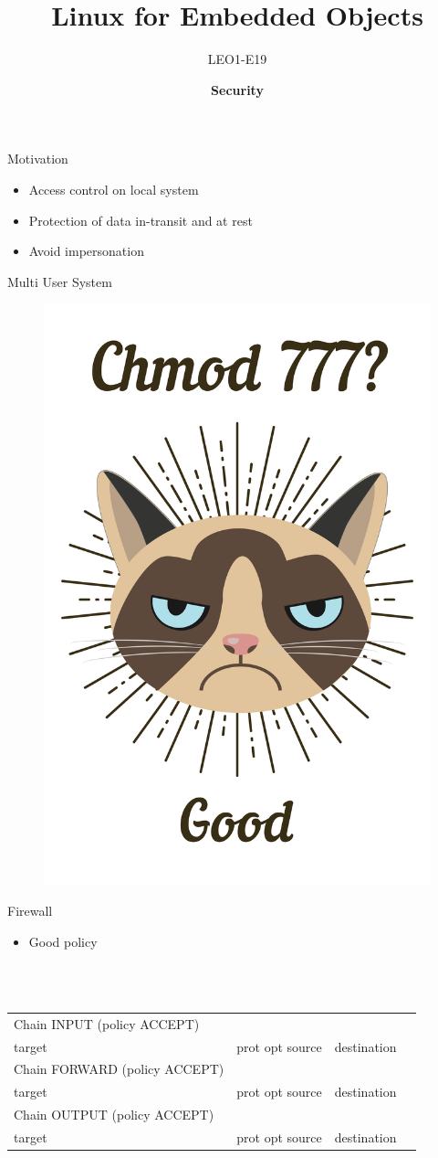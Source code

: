 \documentclass[aspectratio=169,10pt,t]{beamer}
\title{Linux for Embedded Objects}
\subtitle{LEO1-E19}
\date{ }
\author{
  \textbf{Security}
}
\institute[
  SDU Robotics\\
  The Maersk Mc-Kinney Moller Institute\\
  University of Southern Denmark
] %
{%
  The Maersk Mc-Kinney Moller Institute\\
  University of Southern Denmark

}
\begin{document}
{\SDUwavesbg%
\begin{frame} %
  \titlepage
\end{frame}}


\begin{frame}[t]{Motivation}{\phantom{(y)}}
    \begin{itemize}
        \item Access control on local system
        \item Protection of data in-transit and at rest 
        \item Avoid impersonation
    \end{itemize}  
\end{frame}

\begin{frame}[t]{Multi User System}{\phantom{(y)}}
	\vspace{-0.4cm}
	\begin{figure}[h]
		\centering
		\includegraphics[width=0.35\linewidth]{Img/grumpy-chmod-777.png}
	\end{figure}
\end{frame}

\begin{frame}[t]{Firewall}{\phantom{(y)}}
	\begin{itemize}
		\item Good policy
	\end{itemize}

	\\

	\tt
	\begin{tabular}{*{4}{l}}
		Chain INPUT (policy ACCEPT)&&&\\
		target&prot opt source&destination&\\

		Chain FORWARD (policy ACCEPT)\\
		target&prot opt source&destination&\\

		Chain OUTPUT (policy ACCEPT)\\
		target&prot opt source&destination&
	\end{tabular}
\end{frame}
\end{document}
